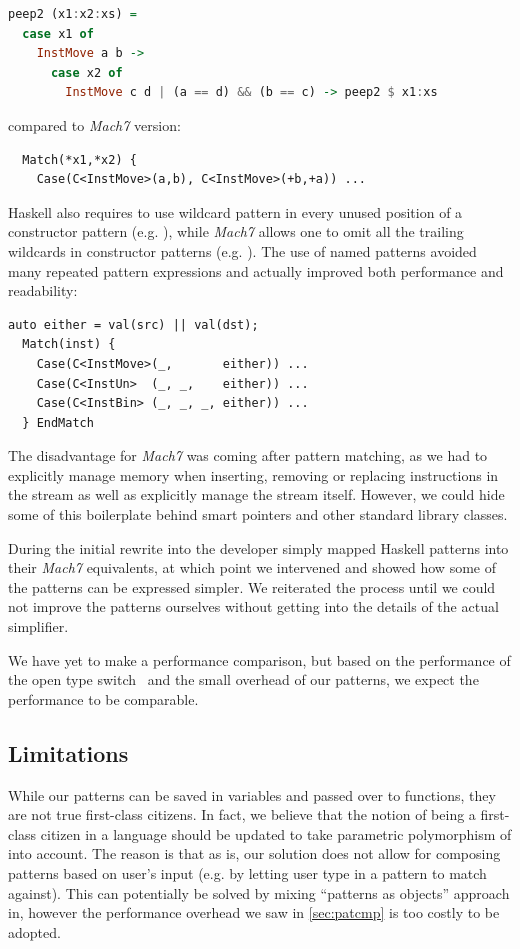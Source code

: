 \begin{lstlisting}[language=Haskell]
peep2 (x1:x2:xs) = 
  case x1 of
    InstMove a b -> 
      case x2 of
        InstMove c d | (a == d) && (b == c) -> peep2 $ x1:xs
\end{lstlisting}

\noindent compared to \emph{Mach7} version:

\begin{lstlisting}
  Match(*x1,*x2) {
    Case(C<InstMove>(a,b), C<InstMove>(+b,+a)) ...
\end{lstlisting}

\noindent
Haskell also requires to use wildcard pattern in every unused position of a 
constructor pattern (e.g. ), while \emph{Mach7} 
allows one to omit all the trailing wildcards in constructor patterns (e.g. 
). The use of named patterns avoided many repeated pattern 
expressions and actually improved both performance and readability:

\begin{lstlisting}[columns=flexible]
  auto either = val(src) || val(dst);
  Match(inst) {
    Case(C<InstMove>(_,       either)) ...
    Case(C<InstUn>  (_, _,    either)) ...
    Case(C<InstBin> (_, _, _, either)) ...
  } EndMatch
\end{lstlisting}

\noindent
The disadvantage for \emph{Mach7} was coming after pattern matching, as we had to 
explicitly manage memory when inserting, removing or replacing instructions in 
the stream as well as explicitly manage the stream itself. However, we could 
hide some of this boilerplate behind smart pointers and other standard library 
classes.

During the initial rewrite into \Cpp{} the developer simply mapped Haskell 
patterns into their \emph{Mach7} equivalents, at which point we intervened and 
showed how some of the patterns can be expressed simpler. We reiterated the 
process until we could not improve the patterns ourselves without getting into 
the details of the actual simplifier.

We have yet to make a performance comparison, but based on the performance of 
the open type switch~\cite{TS12} and the small overhead of our patterns, we 
expect the performance to be comparable.

\subsection{Limitations}
\label{sec:ommlimit}

While our patterns can be saved in variables and passed over to functions, they 
are not true first-class citizens. In fact, we believe that the notion of being 
a first-class citizen in a language should be updated to take parametric 
polymorphism of \Cpp{} into account. The reason is that as is, our solution does
not allow for composing patterns based on user's input (e.g. by letting user 
type in a pattern to match against). This can potentially be solved by mixing 
``patterns as objects'' approach in, however the performance overhead we saw in 
\textsection\ref{sec:patcmp} is too costly to be adopted.
